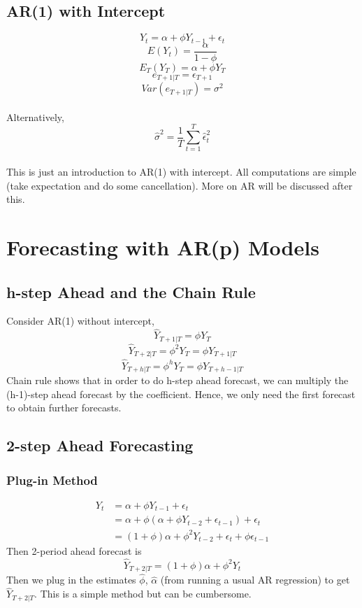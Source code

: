 \documentclass{article}
\begin{document}
\subsection{AR(1) with Intercept}
$$Y_t = \alpha + \phi Y_{t-1} + \epsilon_t$$
$$E(Y_t) = \frac{\alpha}{1-\phi}$$
$$E_T(Y_T) = \alpha + \phi Y_T$$
$$e_{T+1|T} = \epsilon_{T+1}$$
$$Var(e_{T+1|T}) = \sigma^2$$\\
Alternatively,
$$\hat{\sigma}^2 = \frac{1}{T} \sum_{t=1}^T \hat{\epsilon}_t^2$$
\\
This is just an introduction to AR(1) with intercept. All computations are simple (take expectation and do some cancellation). More on AR will be discussed after this.


\section{Forecasting with AR(p) Models}
\subsection{h-step Ahead and the Chain Rule}
Consider AR(1) without intercept,
$$\hat{Y}_{T+1|T} = \phi Y_T$$
$$\hat{Y}_{T+2|T} = \phi^2 Y_T = \phi Y_{T+1|T}$$
$$\hat{Y}_{T+h|T} = \phi^h Y_T = \phi Y_{T+h-1|T}$$
Chain rule shows that in order to do h-step ahead forecast, we can multiply the (h-1)-step ahead forecast by the coefficient. Hence, we only need the first forecast to obtain further forecasts.

\subsection{2-step Ahead Forecasting}
\subsubsection{Plug-in Method}
\begin{align*}
    Y_t &= \alpha + \phi Y_{t-1} + \epsilon_t \\
    &= \alpha + \phi (\alpha + \phi Y_{t-2} + \epsilon_{t-1}) + \epsilon_t \\
    &= (1+\phi)\alpha + \phi^2 Y_{t-2} + \epsilon_t + \phi \epsilon_{t-1}
\end{align*}
Then 2-period ahead forecast is 
$$\hat{Y}_{T+2|T} = (1+\phi)\alpha + \phi^2 Y_t$$
Then we plug in the estimates $\hat{\phi}$, $\hat{\alpha}$ (from running a usual AR regression) to get $\hat{Y}_{T+2|T}$. This is a simple method but can be cumbersome.
\end{document}
